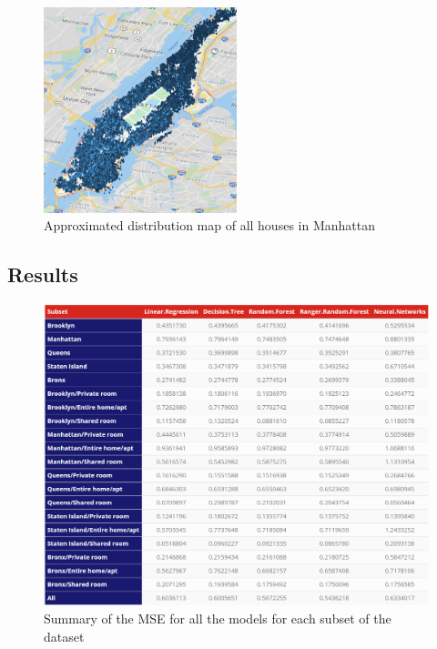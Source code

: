 \documentclass{FR16}
\begin{document}
\begin{figure}[H]
\centering
\includegraphics[width=0.5\textwidth]{figures/figure4.PNG} 
\caption{\label{fig:4}  Approximated distribution map of all houses in Manhattan }
\end{figure}



\subsection{Results}

\begin{figure}[H]
\centering
\includegraphics[width=1\textwidth]{figures/model_summary.PNG} 
\caption{\label{fig:5} Summary of the MSE for all the models for each subset of the dataset }
\end{figure}
\end{document}
